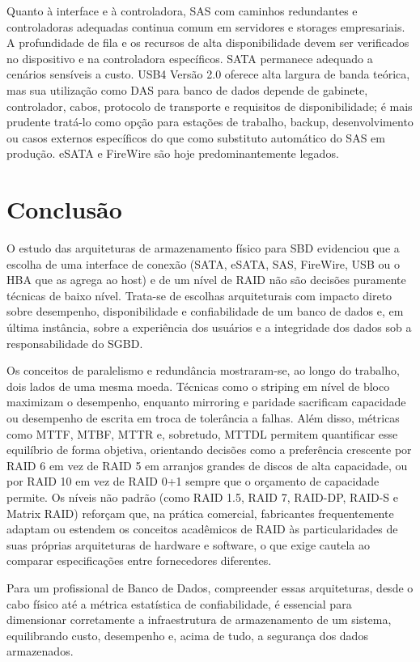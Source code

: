 \documentclass[11pt,a4paper]{article}
\begin{document}
Quanto à interface e à controladora, SAS com caminhos redundantes e controladoras adequadas continua comum em servidores e storages empresariais. A profundidade de fila e os recursos de alta disponibilidade devem ser verificados no dispositivo e na controladora específicos. SATA permanece adequado a cenários sensíveis a custo. USB4 Versão 2.0 oferece alta largura de banda teórica, mas sua utilização como DAS para banco de dados depende de gabinete, controlador, cabos, protocolo de transporte e requisitos de disponibilidade; é mais prudente tratá-lo como opção para estações de trabalho, backup, desenvolvimento ou casos externos específicos do que como substituto automático do SAS em produção. eSATA e FireWire são hoje predominantemente legados.

\section{Conclusão}
O estudo das arquiteturas de armazenamento físico para SBD evidenciou que a escolha de uma interface de conexão (SATA, eSATA, SAS, FireWire, USB ou o HBA que as agrega ao host) e de um nível de RAID não são decisões puramente técnicas de baixo nível. Trata-se de escolhas arquiteturais com impacto direto sobre desempenho, disponibilidade e confiabilidade de um banco de dados e, em última instância, sobre a experiência dos usuários e a integridade dos dados sob a responsabilidade do SGBD.

Os conceitos de paralelismo e redundância mostraram-se, ao longo do trabalho, dois lados de uma mesma moeda. Técnicas como o striping em nível de bloco maximizam o desempenho, enquanto mirroring e paridade sacrificam capacidade ou desempenho de escrita em troca de tolerância a falhas. Além disso, métricas como MTTF, MTBF, MTTR e, sobretudo, MTTDL permitem quantificar esse equilíbrio de forma objetiva, orientando decisões como a preferência crescente por RAID 6 em vez de RAID 5 em arranjos grandes de discos de alta capacidade, ou por RAID 10 em vez de RAID 0+1 sempre que o orçamento de capacidade permite. Os níveis não padrão (como RAID 1.5, RAID 7, RAID-DP, RAID-S e Matrix RAID) reforçam que, na prática comercial, fabricantes frequentemente adaptam ou estendem os conceitos acadêmicos de RAID às particularidades de suas próprias arquiteturas de hardware e software, o que exige cautela ao comparar especificações entre fornecedores diferentes.

Para um profissional de Banco de Dados, compreender essas arquiteturas, desde o cabo físico até a métrica estatística de confiabilidade, é essencial para dimensionar corretamente a infraestrutura de armazenamento de um sistema, equilibrando custo, desempenho e, acima de tudo, a segurança dos dados armazenados.
\end{document}
